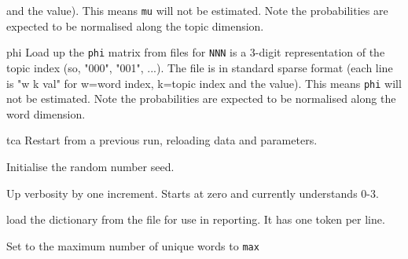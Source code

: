 \documentclass[a4paper,english]{article}
\begin{document}
\begin{Description}
\begin{Description}[type]
and the value).
This means \texttt{mu} will not be estimated.
Note the probabilities are expected to be normalised along the topic dimension.
\item[phi]
Load up the \texttt{phi} matrix from files 
for \texttt{NNN} is a 3-digit representation of the topic index
(so, "000", "001", ...).
The file is in standard sparse format
(each line is "w k val" for w=word index, k=topic index
and the value).
This means \texttt{phi} will not be estimated.
Note the probabilities are expected to be normalised along the word dimension.
\item[tca] 
Restart from a previous run, reloading data and parameters.
\end{Description}
\item[\OptArg{-s}{seed}]
Initialise the random number seed.
\item[\OptArg{-v}] Up verbosity by one increment.
Starts at zero and currently understands 0-3.
\item[\Opt{-V}]  load the dictionary from the
 file for use in reporting.  It has one token per line.
\item[\OptArg{-W}{max}] Set to the maximum number of unique words to \texttt{max}
\end{Description}
\end{document}
